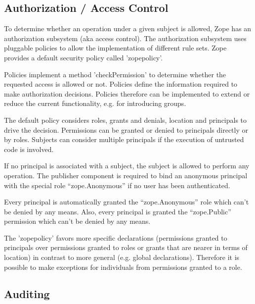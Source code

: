 \documentclass[10pt,a4paper,english]{article}
\begin{document}

\hypertarget{authorization-access-control}{}
\subsection*{Authorization / Access Control}

To determine whether an operation under a given subject is allowed, Zope has an
authorization subsystem (aka access control). The authorization subsystem uses
pluggable policies to allow the implementation of different rule sets. Zope
provides a default security policy called 'zopepolicy'.

Policies implement a method 'checkPermission' to determine whether the
requested access is allowed or not. Policies define the information required to
make authorization decisions.  Policies therefore can be implemented to extend
or reduce the current functionality, e.g. for introducing groups.

The default policy considers roles, grants and denials, location and principals
to drive the decision. Permissions can be granted or denied to principals
directly or by roles.  Subjects can consider multiple principals if the
execution of untrusted code is involved.

If no principal is associated with a subject, the subject is allowed to perform
any operation. The publisher component is required to bind an anonymous
principal with the special role ``zope.Anonymous'' if no user has been
authenticated.

Every principal is automatically granted the ``zope.Anonymous'' role which can't be
denied by any means. Also, every principal is granted the ``zope.Public''
permission which can't be denied by any means.

The 'zopepolicy' favors more specific declarations (permissions granted to
principals over permissions granted to roles or grants that are nearer in terms
of location) in contrast to more general (e.g. global declarations). Therefore
it is possible to make exceptions for individuals from permissions granted to a
role.



\hypertarget{auditing}{}
\subsection*{Auditing}
\end{document}
